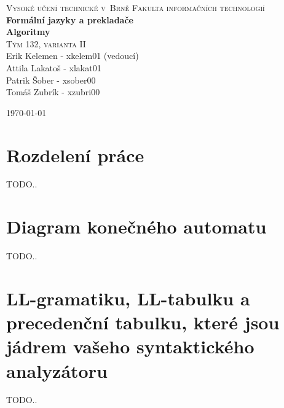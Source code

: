 \documentclass[a4paper, 11 pt]{article}
\begin{document}
\begin{titlepage}
\begin{center}
\textsc{\Huge Vysoké učení technické v~Brně
Fakulta informačních technologií} \\
\Huge \textbf{Formální jazyky a prekladače \\ Algoritmy} \\
\textsc{\Huge Tým 132, varianta II} \\
\LARGE \textmd{Erik Kelemen - xkelem01 (vedoucí)\\
	Attila Lakatoš - xlakat01 \\
	Patrik Šober - xsober00 \\
	Tomáš Zubrík - xzubri00} \\
\end{center}
{\LARGE \today}
\end{titlepage}

\section{\textbf{Rozdelení práce}}
TODO..

\section{\textbf{Diagram konečného automatu}}
TODO..

\section{\textbf{LL-gramatiku, LL-tabulku a precedenční tabulku, které jsou jádrem vašeho syntaktického analyzátoru}}
TODO..
\end{document}
